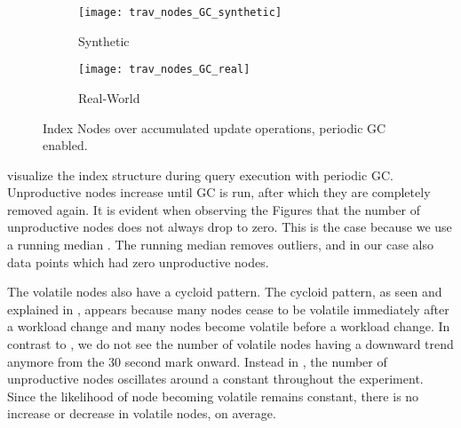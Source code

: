 \documentclass[abstracton,12pt]{scrartcl}
\theoremstyle{definition}
\begin{document}
\begin{figure}[ht]
  \centering
  \begin{subfigure}{0.49\linewidth}
    \centering
    \caption{Synthetic}
    \texttt{[image: trav\_nodes\_GC\_synthetic]}
    \label{fig:trav_nodes_GC_synthetic}
  \end{subfigure}
  \begin{subfigure}{0.49\linewidth}
    \centering
    \caption{Real-World}
    \texttt{[image: trav\_nodes\_GC\_real]}
    \label{fig:trav_nodes_GC_real}
  \end{subfigure}
  \vspace{-0.8cm}
  \caption[Index Nodes over accumulated update operations, periodic GC enabled]{
  Index Nodes over accumulated update operations, periodic GC enabled.}
\end{figure}

 visualize the index
structure during query execution with periodic GC. Unproductive
nodes increase until GC is run, after which they are completely removed again.
It is evident when observing the Figures that the number of unproductive nodes
does not always drop to zero.
This is the case because we use a running median \cite{running-median}.
The running median removes outliers, and in
our case also data points which had zero unproductive nodes.

The volatile nodes also have a cycloid pattern.
The cycloid pattern, as seen and explained in
,
appears because many nodes cease to be volatile immediately after
a workload change and many nodes become volatile before a workload change.
In contrast to , 
we do not see the number of volatile nodes
having a downward trend anymore from the 30 second mark onward.
Instead in , 
the number of unproductive nodes oscillates around a constant throughout the experiment. 
Since the likelihood of node becoming volatile remains constant, there is no
increase or decrease in volatile nodes, on average.
\end{document}
